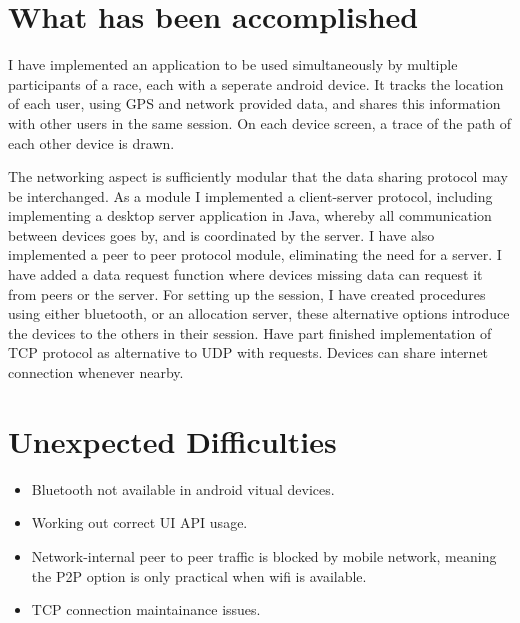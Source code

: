 \documentclass{article}
\begin{document}
\section*{What has been accomplished}

I have implemented an application to be used simultaneously by multiple participants of a race, each with a seperate android device. It tracks the location of each user, using GPS and network provided data, and shares this information with other users in the same session. On each device screen, a trace of the path of each other device is drawn.

The networking aspect is sufficiently modular that the data sharing protocol may be interchanged. As a module I implemented a client-server protocol, including implementing a desktop server application in Java, whereby all communication between devices goes by, and is coordinated by the server.
I have also implemented a peer to peer protocol module, eliminating the need for a server.
I have added a data request function where devices missing data can request it from peers or the server.
For setting up the session, I have created procedures using either bluetooth, or an allocation server, these alternative options introduce the devices to the others in their session.
Have part finished implementation of TCP protocol as alternative to UDP with requests.
Devices can share internet connection whenever nearby.

\section*{Unexpected Difficulties}
\begin{itemize}
\item{Bluetooth not available in android vitual devices.}
\item{Working out correct UI API usage.}
\item{Network-internal peer to peer traffic is blocked by mobile network, meaning the P2P option is only practical when wifi is available.}
\item{TCP connection maintainance issues.}
\end{itemize}
\end{document}
